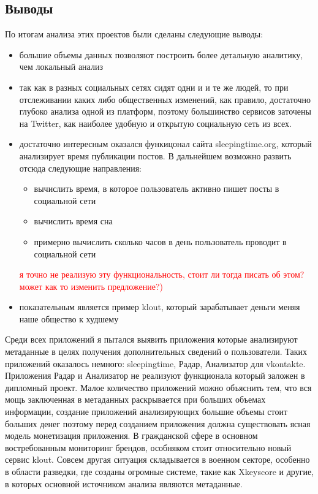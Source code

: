 \subsection{Выводы}
По итогам анализа этих проектов были сделаны следующие выводы:
\begin{itemize}
\item большие объемы данных позволяют построить более детальную аналитику, чем локальный анализ
\item так как в разных социальных сетях сидят одни и и те же людей, то при отслеживании каких либо общественных изменений, как правило, достаточно глубоко анализа одной из платформ, поэтому большинство сервисов заточены на Twitter, как наиболее удобную и открытую социальную сеть из всех.
\item достаточно интересным оказался функицонал сайта  sleepingtime.org, который анализирует время публикации постов. В дальнейшем возможно развить отсюда следующие направления:
	\begin{itemize}
	\item вычислить время, в которое пользователь активно пишет посты в социальной сети
	\item вычислить время сна
	\item примерно вычислить сколько часов в день пользователь проводит в социальной сети
	\end{itemize}
\textcolor{red}{я точно не реализую эту функциональность, стоит ли тогда писать об этом? может как то изменить предложение?)}
\item показательным является пример klout, который зарабатывает деньги меняя наше общество к худшему
\end{itemize}
Среди всех приложений я пытался выявить приложения которые анализируют метаданные в целях получения дополнительных сведений о пользователи. Таких приложений оказалось немного: sleepingtime, Радар, Анализатор для vkontakte. Приложения Радар и Анализатор не реализуют функционала который заложен в дипломный проект. Малое количество приложений можно объяснить тем, что вся мощь заключенная в метаданных раскрывается при больших объемах информации, создание приложений анализирующих большие объемы стоит больших денег поэтому перед созданием приложения должна существовать ясная модель монетизация приложения. В гражданской сфере в основном востребованным мониторинг брендов, особняком стоит относительно новый сервис klout. Совсем другая ситуация складывается в военном секторе, особенно в области разведки, где созданы огромные системе, такие как Xkeyscore и другие, в которых основной источником анализа являются метаданные.  %

